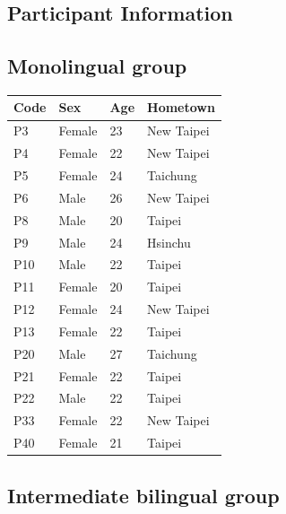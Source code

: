 \documentclass[12pt]{report}
\begin{document}
\begin{CJK}{UTF8}{bsmi}
\pagebreak
\chapter{Participant Information}\label{Appendix:ParticipantInfo}

\section{Monolingual group}

\begin{flushleft}
\begin{table}[hbt!]
\begin{tabularx}{\textwidth}{|l||X|X|X|}
\hline
Code&Sex&Age&Hometown\\
\hline
\hline
P3&Female&23&New Taipei\\
\hline
P4&Female&22&New Taipei\\
\hline
P5&Female&24&Taichung\\
\hline
P6&Male&26&New Taipei\\
\hline
P8&Male&20&Taipei\\
\hline
P9&Male&24&Hsinchu\\
\hline
P10&Male&22&Taipei\\
\hline
P11&Female&20&Taipei\\
\hline
P12&Female&24&New Taipei\\
\hline
P13&Female&22&Taipei\\
\hline
P20&Male&27&Taichung\\
\hline
P21&Female&22&Taipei\\
\hline
P22&Male&22&Taipei\\
\hline
P33&Female&22&New Taipei\\
\hline
P40&Female&21&Taipei\\
\hline

\end{tabularx}
\end{table}
\end{flushleft}

\pagebreak
\section{Intermediate bilingual group}


\end{CJK}
\end{document}
